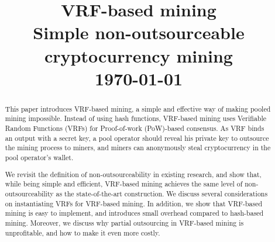 \documentclass[conference]{IEEEtran}
\begin{document}
\title{VRF-based mining\\
\LARGE Simple non-outsourceable cryptocurrency mining\\
\vspace*{20pt} \large  \today{}}



\maketitle

\begin{abstract}
  This paper introduces VRF-based mining, a simple and effective way of making pooled mining impossible.
  Instead of using hash functions, VRF-based mining uses Verifiable Random Functions (VRFs) for Proof-of-work (PoW)-based consensus.
  As VRF binds an output with a secret key, a pool operator should reveal his private key to outsource the mining process to miners, and miners can anonymously steal cryptocurrency in the pool operator's wallet.
  
  We revisit the definition of non-outsourceability in existing research, and show that, while being simple and efficient, VRF-based mining achieves the same level of non-outsourceability as the state-of-the-art construction.
  We discuss several considerations on instantiating VRFs for VRF-based mining.
  In addition, we show that VRF-based mining is easy to implement, and introduces small overhead compared to hash-based mining.
  Moreover, we discuss why partial outsourcing in VRF-based mining is unprofitable, and how to make it even more costly.
\end{abstract}















\appendix

\end{document}
